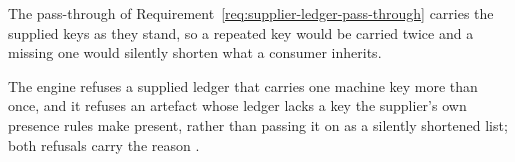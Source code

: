
The pass-through of Requirement~\ref{req:supplier-ledger-pass-through}
carries the supplied keys as they stand, so a repeated key would be carried
twice and a missing one would silently shorten what a consumer inherits.

\begin{requirement}\label{req:supplier-ledger-refusals}
The engine refuses a supplied ledger that carries one machine key more than
once, and it refuses an artefact whose ledger lacks a key the supplier's own
presence rules make present, rather than passing it on as a silently
shortened list; both refusals carry the reason
.
\end{requirement}
